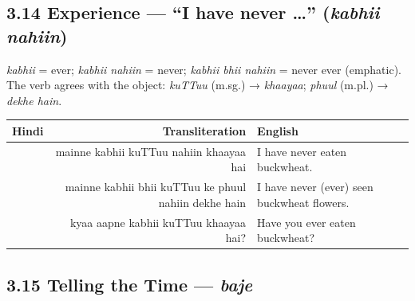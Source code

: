\subsection{3.14 Experience — ``I have never \ldots'' (\textit{kabhii nahiin})}


\textit{kabhii} = ever; \textit{kabhii nahiin} = never; \textit{kabhii bhii nahiin} = never ever (emphatic).
The verb agrees with the object: \textit{kuTTuu} (m.sg.) → \textit{khaayaa}; \textit{phuul} (m.pl.) → \textit{dekhe hain}.

\begin{tabular}{@{}HRG@{}}
  \toprule
  Hindi & Transliteration & English \\
  \midrule
            & mainne kabhii kuTTuu nahiin khaayaa hai     & I have never eaten buckwheat. \\
   & mainne kabhii bhii kuTTuu ke phuul nahiin dekhe hain & I have never (ever) seen buckwheat flowers. \\
            & kyaa aapne kabhii kuTTuu khaayaa hai?      & Have you ever eaten buckwheat? \\
  \bottomrule
\end{tabular}

\subsection{3.15 Telling the Time — \textit{baje}}


